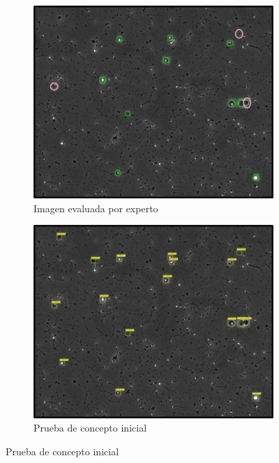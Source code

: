 \documentclass[12pt,a4paper,onecolumn,oneside]{report}
\begin{document}
\begin{figure}[H]
  \centering
  \begin{subfigure}[b]{0.48\textwidth}
    \centering
    \includegraphics[width=\textwidth]{figuras/evaluacion_cualitativa/95/95.jpg}
    \caption{Imagen evaluada por experto}
    \label{fig:exp_image_95}
  \end{subfigure}
  \hfill
  \begin{subfigure}[b]{0.48\textwidth}
    \centering
    \includegraphics[width=\textwidth]{figuras/evaluacion_cualitativa/95/95_v7.jpg}
    \caption{Prueba de concepto inicial}
    \label{fig:poc_image_95}
  \end{subfigure}
  

\end{figure}
\end{document}
